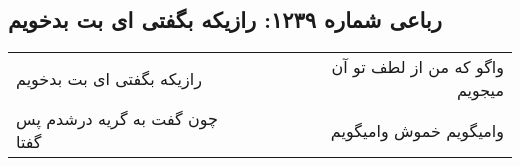 \begin{center}
\section*{رباعی شماره ۱۲۳۹: رازیکه بگفتی ای بت بدخویم}
\label{sec:1239}
\begin{longtable}{l p{0.5cm} r}
رازیکه بگفتی ای بت بدخویم
&&
واگو که من از لطف تو آن میجویم
\\
چون گفت به گریه درشدم پس گفتا
&&
وامیگویم خموش وامیگویم
\\
\end{longtable}
\end{center}
